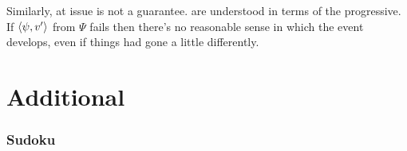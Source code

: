 \begin{note}
  Similarly, at issue is not a guarantee.
   are understood in terms of the progressive.
  If \(\langle \psi, v' \rangle\) from \(\Psi\) fails then there's no reasonable sense in which the event develops, even if things had gone a little differently.
\end{note}

\section{Additional }
\label{cha:requs:sec:add-illu}

\subsubsection{Sudoku}
\label{sec:sudoku}

